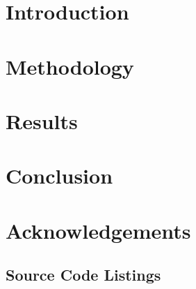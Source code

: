 \documentclass{article}
\begin{document}

\newpage

\newpage
\tableofcontents

\newpage
\section{Introduction}

\section{Methodology}

\section{Results}\label{section:results}

\section{Conclusion}

\section{Acknowledgements}


\newpage
\printbibliography[heading=bibintoc, title={References}]
\newpage
\begin{appendices}
\section{Source Code Listings}\label{section:source}

\end{appendices}
\end{document}
